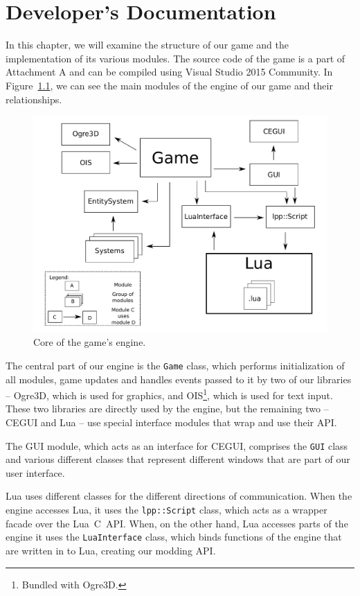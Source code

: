 \chapter{Developer's Documentation}

In this chapter, we will examine the structure of our game and the implementation of its
various modules. The source code of the game is a part of Attachment A and can be compiled using Visual Studio 2015 Community.
In Figure~\ref{engine-layout}, we can see the main modules of the engine of our game and their relationships.

\begin{figure}[H]
    \centering
    \includegraphics[width=\columnwidth]{../img/engine.pdf}
    \caption{Core of the game's engine.}
    \label{engine-layout}
\end{figure}

The central part of our engine is the \texttt{Game} class, which performs initialization of all modules, game updates and handles events
passed to it by two of our libraries -- Ogre3D, which is used for graphics, and OIS\footnote{Bundled with Ogre3D.}, which is used for
text input. These two libraries are directly used by the engine, but the remaining two -- CEGUI and Lua -- use special interface modules
that wrap and use their API.

The GUI module, which acts as an interface for CEGUI, comprises the \texttt{GUI} class and various different classes that represent
different windows that are part of our user interface.

Lua uses different classes for the different directions of communication. When the engine accesses Lua, it uses
the \texttt{lpp::Script} class, which acts as a wrapper facade over the Lua~C~API. When, on the other hand, Lua accesses parts of the
engine it uses the \texttt{LuaInterface} class, which binds functions of the engine that are written in \cpp to Lua, creating our
modding API.

